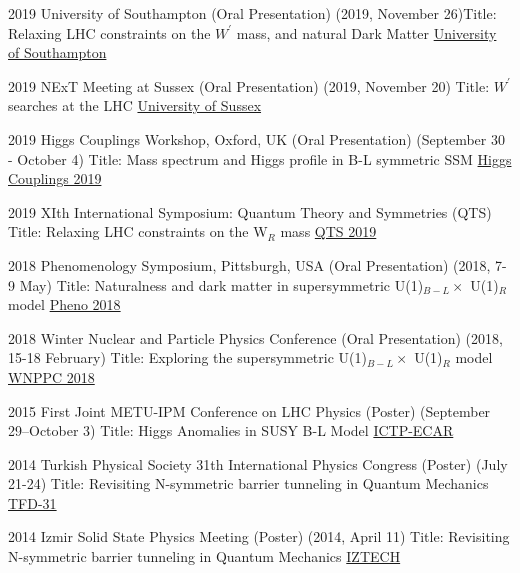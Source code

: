 \documentclass[]{friggeri-cv}
\begin{document}
\begin{entrylist}
	
	\entrySuperLong
	{2019}
	{University of Southampton \normalfont (Oral Presentation) (2019, November 26)}{Title: Relaxing LHC constraints on the $W^\prime$ mass, and natural Dark Matter} 
	{\href{https://www.hep.phys.soton.ac.uk/content/Tuesday-2019-11-26-Ozer-Ozdal}{University of Southampton}} 	
	
	\entrySuperLong
	{2019}
	{NExT Meeting at Sussex \normalfont (Oral Presentation) (2019, November 20)}
	{Title: $W^\prime$ searches at the LHC}
	{\href{https://indico.cern.ch/event/857401/overview}{University of Sussex}} 		
	
	\entrySuperLong
	{2019}
	{Higgs Couplings Workshop, Oxford, UK \normalfont (Oral Presentation) (September 30 - October 4)}
	{Title: Mass spectrum and Higgs profile in B-L symmetric SSM}
	{\href{https://indico.cern.ch/event/796574/contributions/3521711/}{Higgs Couplings 2019}} 	
		
	\entrySuperLong
	{2019}
	{XIth International Symposium: Quantum Theory and Symmetries (QTS)}
	{Title: Relaxing LHC constraints on the W$_R$ mass}
	{\href{http://www.crm.umontreal.ca/2019/QTS2019/pdf/ozdal.pdf}{QTS 2019}} 
	
	\entrySuperLong
	{2018}
	{Phenomenology Symposium, Pittsburgh, USA  \normalfont (Oral Presentation) (2018, 7-9 May)}
	{Title: Naturalness and dark matter in supersymmetric U(1)$_{B-L} \times$ U(1)$_R$ model}
	{\href{https://indico.cern.ch/event/699148/}{Pheno 2018}} 
	
	\entrySuperLong
	{2018}
	{Winter Nuclear and Particle Physics Conference  \normalfont (Oral Presentation) (2018, 15-18 February)}
	{Title: Exploring the supersymmetric U(1)$_{B-L} \times$ U(1)$_R$ model}
	{\href{http://wnppc.triumf.ca/2018/}{WNPPC 2018}}
	
	\entrySuperLong
	{2015}
	{First Joint METU-IPM Conference on LHC Physics  \normalfont (Poster) (September 29--October 3)}
	{Title: Higgs Anomalies in SUSY B-L Model}
	{\href{http://ictp-ecar.org/events/first-joint-metu-ipm-conference-on-lhc-physics/}{ICTP-ECAR}}
	
	\entrySuperLong
	{2014}
	{Turkish Physical Society 31th International Physics Congress \normalfont (Poster) (July 21-24)}
	{Title: Revisiting N-symmetric barrier tunneling in Quantum Mechanics}
	{\href{http://www.tfd.com.tr/arsiv/TFD/31/en/default.htm}{TFD-31}}
	
	\entrySuperLong
	{2014}
	{Izmir Solid State Physics Meeting  \normalfont (Poster) (2014, April 11)}
	{Title: Revisiting N-symmetric barrier tunneling in Quantum Mechanics}
	{\href{http://ymf.iyte.edu.tr/?page_id=234}{IZTECH}}
	
	
\end{entrylist}
\end{document}
